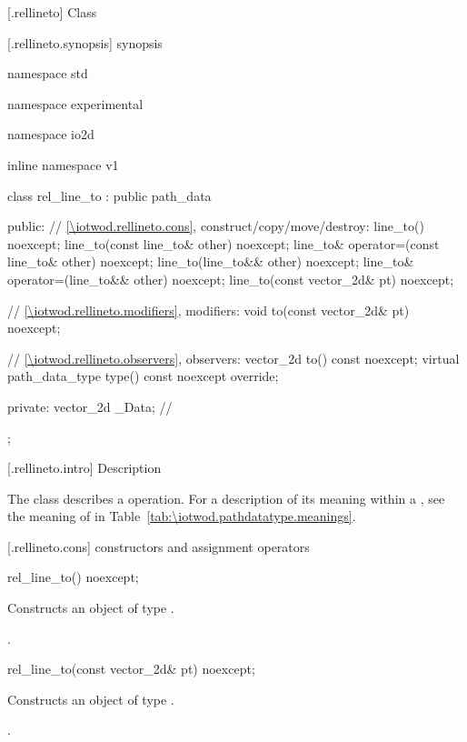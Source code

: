  [\iotwod.rellineto] {Class }

 [\iotwod.rellineto.synopsis] { synopsis}

\begin{codeblock}
namespace std { namespace experimental { namespace io2d { inline namespace v1 {
  class rel_line_to : public path_data {
  public:
    // \ref{\iotwod.rellineto.cons}, construct/copy/move/destroy:
    line_to() noexcept;
    line_to(const line_to& other) noexcept;
    line_to& operator=(const line_to& other) noexcept;
    line_to(line_to&& other) noexcept;
    line_to& operator=(line_to&& other) noexcept;
    line_to(const vector_2d& pt) noexcept;

    // \ref{\iotwod.rellineto.modifiers}, modifiers:
    void to(const vector_2d& pt) noexcept;

    // \ref{\iotwod.rellineto.observers}, observers:
    vector_2d to() const noexcept;
    virtual path_data_type type() const noexcept override;
    
  private:
    vector_2d _Data; // \expos
  };
} } } }
\end{codeblock}

 [\iotwod.rellineto.intro] { Description}

\pnum
{}
The class  describes a  operation. For a description of its meaning within a , see the meaning of  in Table~\ref{tab:\iotwod.pathdatatype.meanings}.

 [\iotwod.rellineto.cons] { constructors and assignment operators}

\begin{itemdecl}
    rel_line_to() noexcept;
\end{itemdecl}
\begin{itemdescr}
	\pnum
	\effects
	Constructs an object of type .
	
	\pnum
	\postconditions
	.
\end{itemdescr}

\begin{itemdecl}
    rel_line_to(const vector_2d& pt) noexcept;
\end{itemdecl}
\begin{itemdescr}
	\pnum
	\effects
	Constructs an object of type .
	
	\pnum
	\postconditions
	.
\end{itemdescr}

